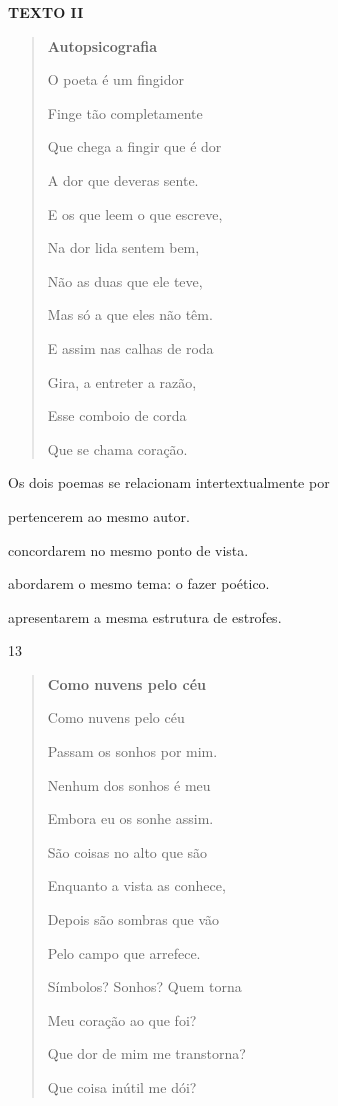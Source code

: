
\textbf{TEXTO II}

\begin{quote}
\textbf{Autopsicografia}

O poeta é um fingidor

Finge tão completamente

Que chega a fingir que é dor

A dor que deveras sente.

E os que leem o que escreve,

Na dor lida sentem bem,

Não as duas que ele teve,

Mas só a que eles não têm.

E assim nas calhas de roda

Gira, a entreter a razão,

Esse comboio de corda

Que se chama coração.
\end{quote}


Os dois poemas se relacionam intertextualmente por

\begin{escolha}
\item pertencerem ao mesmo autor.

\item concordarem no mesmo ponto de vista.

\item abordarem o mesmo tema: o fazer poético.

\item apresentarem a mesma estrutura de estrofes.
\end{escolha}

\num{13}

\begin{quote}
\textbf{Como nuvens pelo céu}

Como nuvens pelo céu

Passam os sonhos por mim.

Nenhum dos sonhos é meu

Embora eu os sonhe assim.

São coisas no alto que são

Enquanto a vista as conhece,

Depois são sombras que vão

Pelo campo que arrefece.

Símbolos? Sonhos? Quem torna

Meu coração ao que foi?

Que dor de mim me transtorna?

Que coisa inútil me dói?
\end{quote}

